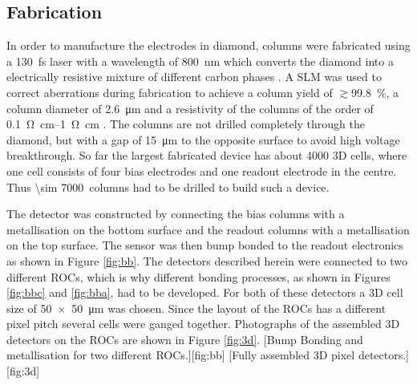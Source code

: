 \subsection{Fabrication}
In order to manufacture the electrodes in diamond, columns were fabricated using a \SI{130}{\femto\second} laser with a wavelength of \SI{800}{\nano\meter} which converts the diamond into a electrically resistive mixture of different carbon phases \cite{3dfab}. A \ac{SLM} was used to correct aberrations during fabrication to achieve a column yield of $\gtrsim$\SI{ 99.8}{\%}, a column diameter of \SI{2.6}{\micro\meter} and a resistivity of the columns of the order of \SIrange{.1}{1}{\ohm\cm} \cite{slm}. The columns are not drilled completely through the diamond, but with a gap of \SI{15}{\micro\meter} to the opposite surface to avoid high voltage breakthrough. So far the largest fabricated device has about 4000 3D cells, where one cell consists of four bias electrodes and one readout electrode in the centre. Thus \SI{\sim 7000}{columns} had to be drilled to build such a device. \par
The detector was constructed by connecting the bias columns with a metallisation on the bottom surface and the readout columns with a metallisation on the top surface. The sensor was then bump bonded to the readout electronics as shown in Figure \vref{fig:bb}. The detectors described herein were connected to two different \acp{ROC}, which is why different bonding processes, as shown in Figures \vref{fig:bbc} and \vref{fig:bba}, had to be developed. For both of these detectors a 3D cell size of \SI{50x50}{\micro\meter} was chosen. Since the layout of the \acp{ROC} has a different pixel pitch several cells were ganged together. Photographs of the assembled 3D detectors on the \acp{ROC} are shown in Figure \vref{fig:3d}.
[Bump Bonding and metallisation for two different \acp{ROC}.][fig:bb]
[Fully assembled 3D pixel detectors.][fig:3d]